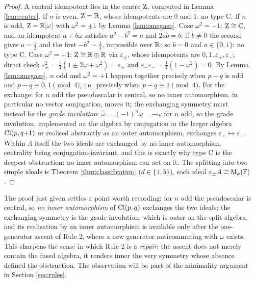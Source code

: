 \begin{proof}
A central idempotent lies in the centre $\mathrm{Z}$, computed in Lemma \ref{lem:center}. If $n$ is even, $\mathrm{Z} = \mathbb{R}$, whose idempotents are $0$ and $1$: no type C. If $n$ is odd, $\mathrm{Z} = \mathbb{R}[\omega]$ with $\omega^2 = \pm 1$ by Lemma \ref{lem:omegasq}. Case $\omega^2 = -1$: $\mathrm{Z} \cong \mathbb{C}$, and an idempotent $a + b\omega$ satisfies $a^2 - b^2 = a$ and $2ab = b$; if $b \neq 0$ the second gives $a = \tfrac12$ and the first $-b^2 = \tfrac14$, impossible over $\mathbb{R}$; so $b = 0$ and $a \in \{0,1\}$: no type C. Case $\omega^2 = +1$: $\mathrm{Z} \cong \mathbb{R} \oplus \mathbb{R}$ via $\varepsilon_\pm$, whose idempotents are $0, 1, \varepsilon_+, \varepsilon_-$; direct check $\varepsilon_\pm^2 = \tfrac14(1 \pm 2\omega + \omega^2) = \varepsilon_\pm$ and $\varepsilon_+\varepsilon_- = \tfrac14(1 - \omega^2) = 0$. By Lemma \ref{lem:omegasq}, $n$ odd and $\omega^2 = +1$ happen together precisely when $p - q$ is odd and $p - q \equiv 0, 1 \pmod 4$, i.e.\ precisely when $p - q \equiv 1 \pmod 4$. For the exchange: for $n$ odd the pseudoscalar is central, so no inner automorphism, in particular no vector conjugation, moves it; the exchanging symmetry must instead be the \emph{grade involution}: $\hat{\omega} = (-1)^n \omega = -\omega$ for $n$ odd, so the grade involution, implemented on the algebra by conjugation in the larger algebra $\mathrm{Cl}(p,q{+}1)$ or realised abstractly as an outer automorphism, exchanges $\varepsilon_+ \leftrightarrow \varepsilon_-$. Within $A$ itself the two ideals are exchanged by no inner automorphism, centrality being conjugation-invariant, and this is exactly why type C is the deepest obstruction: no inner automorphism can act on it. The splitting into two simple ideals is Theorem \ref{thm:classification} ($d \in \{1,5\}$), each ideal $\varepsilon_\pm A \cong \mathrm{M}_k(\mathbb{F})$.
\end{proof}

\begin{remark}\label{rem:typeC-depth}
The proof just given settles a point worth recording: for $n$ odd the pseudoscalar is central, so \emph{no inner automorphism} of $\mathrm{Cl}(p,q)$ exchanges the two ideals; the exchanging symmetry is the grade involution, which is outer on the split algebra, and its realisation by an inner automorphism is available only after the one-generator ascent of Rule 2, where a new generator anticommuting with $\omega$ exists. This sharpens the sense in which Rule 2 is a \emph{repair}: the ascent does not merely contain the fused algebra, it renders inner the very symmetry whose absence defined the obstruction. The observation will be part of the minimality argument in Section \ref{sec:rules}.
\end{remark}

